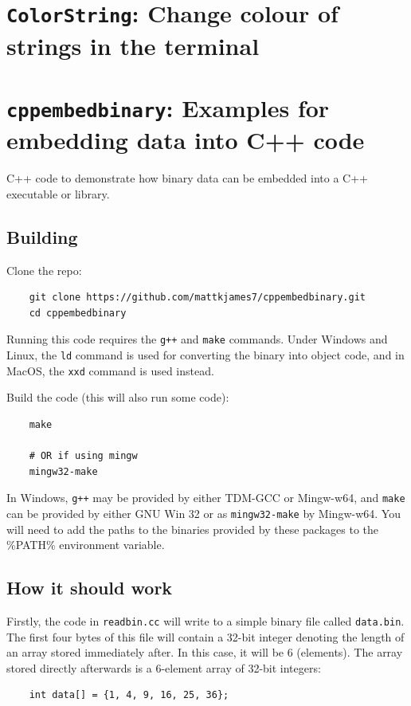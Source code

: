 	\section{\texttt{ColorString}: Change colour of strings in the terminal}
	\section{\texttt{cppembedbinary}: Examples for embedding data into C++ code}


	C++ code to demonstrate how binary data can be embedded into a C++ executable or library.
	
	\subsection{Building}
	
	Clone the repo:
	\begin{verbatim}
	git clone https://github.com/mattkjames7/cppembedbinary.git
	cd cppembedbinary
	\end{verbatim}
	
	Running this code requires the \texttt{g++} and \texttt{make} commands. Under Windows and Linux, the \texttt{ld} command is used for converting the binary into object code, and in MacOS, the \texttt{xxd} command is used instead.
	
	Build the code (this will also run some code):
	\begin{verbatim}
	make
	
	# OR if using mingw
	mingw32-make
	\end{verbatim}
	
	In Windows, \texttt{g++} may be provided by either TDM-GCC or Mingw-w64, and \texttt{make} can be provided by either GNU Win 32 or as \texttt{mingw32-make} by Mingw-w64. You will need to add the paths to the binaries provided by these packages to the \%PATH\% environment variable.
	
	\subsection{How it should work}
	
	Firstly, the code in \texttt{readbin.cc} will write to a simple binary file called \texttt{data.bin}. The first four bytes of this file will contain a 32-bit integer denoting the length of an array stored immediately after. In this case, it will be 6 (elements). The array stored directly afterwards is a 6-element array of 32-bit integers:
	\begin{verbatim}
	int data[] = {1, 4, 9, 16, 25, 36};
	\end{verbatim}
	
